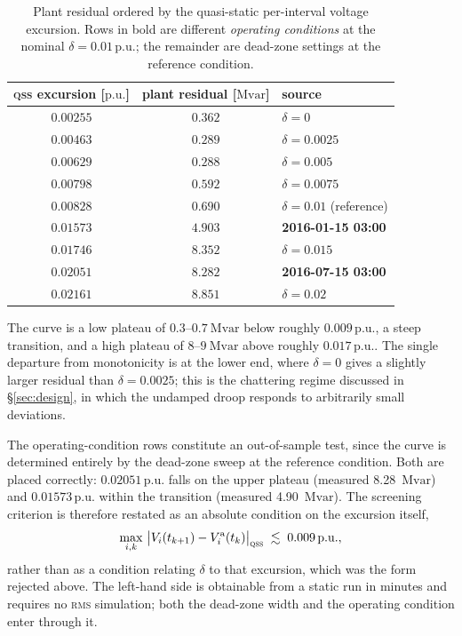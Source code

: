 \documentclass[11pt,a4paper]{article}
\newcommand{\pu}{\ensuremath{\mathrm{p.u.}}}
\newcommand{\Mvar}{\ensuremath{\mathrm{Mvar}}}
\newcommand{\qss}{\textsc{qss}}
\newcommand{\rms}{\textsc{rms}}
\begin{document}
\begin{table}[htbp]
  \centering
  \caption{Plant residual ordered by the quasi-static per-interval voltage
  excursion. Rows in bold are different \emph{operating conditions} at the
  nominal $\delta = 0.01\,\pu$; the remainder are dead-zone settings at the
  reference condition.}
  \label{tab:unified}
  \begin{tabular}{ccl}
    \toprule
    \qss{} excursion [\pu] & plant residual [\Mvar] & source \\
    \midrule
    $0.00255$ & $0.362$ & $\delta = 0$ \\
    $0.00463$ & $0.289$ & $\delta = 0.0025$ \\
    $0.00629$ & $0.288$ & $\delta = 0.005$ \\
    $0.00798$ & $0.592$ & $\delta = 0.0075$ \\
    $0.00828$ & $0.690$ & $\delta = 0.01$ (reference) \\
    $\mathbf{0.01573}$ & $\mathbf{4.903}$ & \textbf{2016-01-15 03:00} \\
    $0.01746$ & $8.352$ & $\delta = 0.015$ \\
    $\mathbf{0.02051}$ & $\mathbf{8.282}$ & \textbf{2016-07-15 03:00} \\
    $0.02161$ & $8.851$ & $\delta = 0.02$ \\
    \bottomrule
  \end{tabular}
\end{table}

The curve is a low plateau of $0.3$--$\SI{0.7}{\Mvar}$ below roughly
$0.009\,\pu$, a steep transition, and a high plateau of $8$--$\SI{9}{\Mvar}$
above roughly $0.017\,\pu$. The single departure from monotonicity is at the
lower end, where $\delta = 0$ gives a slightly larger residual than
$\delta = 0.0025$; this is the chattering regime discussed in
\S\ref{sec:design}, in which the undamped droop responds to arbitrarily small
deviations.

The operating-condition rows constitute an out-of-sample test, since the
curve is determined entirely by the dead-zone sweep at the reference
condition. Both are placed correctly: $0.02051\,\pu$ falls on the upper
plateau (measured \SI{8.28}{\Mvar}) and $0.01573\,\pu$ within the transition
(measured \SI{4.90}{\Mvar}). The screening criterion is therefore restated as
an absolute condition on the excursion itself,
%
\begin{equation}
  \max_{i,k}\,\big|V_i(t_{k+1}) - V^{\mathrm{a}}_i(t_k)\big|_{\qss}
  \;\lesssim\; 0.009\,\pu ,
  \label{eq:criterion}
\end{equation}
%
rather than as a condition relating $\delta$ to that excursion, which was the
form rejected above. The left-hand side is obtainable from a static run in
minutes and requires no \rms{} simulation; both the dead-zone width and the
operating condition enter through it.
\end{document}
